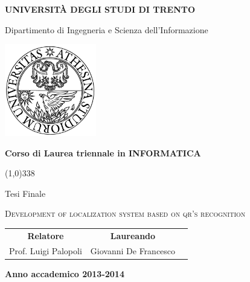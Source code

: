 \begin{titlepage}
  \pagestyle{empty}

  \begin{center}
    {\bfseries
      \Large {\huge U}NIVERSITÀ DEGLI STUDI DI {\huge T}RENTO}

    \vspace{0.2cm}

    {\Large Dipartimento di Ingegneria e Scienza dell'Informazione}

    \vspace{0.5cm}

    \begin{center}
      \includegraphics[width=0.3\textwidth]{img/logo_unitn.png}
    \end{center}

    \vspace{0.5cm}

    {\bfseries \Large Corso di Laurea triennale in INFORMATICA}

    \vspace{0.3cm}
    \line(1,0){338}
    \vspace{0.3cm}

    {\Large Tesi Finale}

    \vspace{2.5cm}

    {\huge \textsc{Development of localization system based on qr's recognition}\\}

    \vspace{3.0cm}


    \large
    \begin{center}
      \begin{tabular}{ccc}
        {\bfseries Relatore} &
        \hspace{5cm}
        {\bfseries Laureando} \\

        Prof. Luigi Palopoli &
        \hspace{5cm} Giovanni De Francesco \\


      \end{tabular}
    \end{center}
    \vspace{2.5cm}

    {\bfseries Anno accademico 2013-2014}
    \vfill
  \end{center}
\end{titlepage}